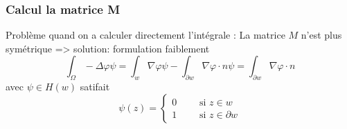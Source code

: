 \begin{frame}
\frametitle{Calcul la matrice M}
Probl\`eme quand on a calculer directement l'int\'egrale : La matrice $M$ n'est plus sym\'etrique 
=> solution: formulation faiblement
\begin{equation}
\int_\Omega -\Delta\varphi \psi =\int_w \nabla\varphi\psi - \int_{\partial w} \nabla\varphi\cdot n \psi =\int_{\partial w} \nabla\varphi\cdot n 
\end{equation}
avec $\psi \in H(w)$ satifait 
\begin{equation}
\psi(z) =
\begin{cases}
0 \qquad \text{ si } z\in w \\
1 \qquad \text{ si } z\in \partial w
\end{cases}
\end{equation} 


\end{frame} 